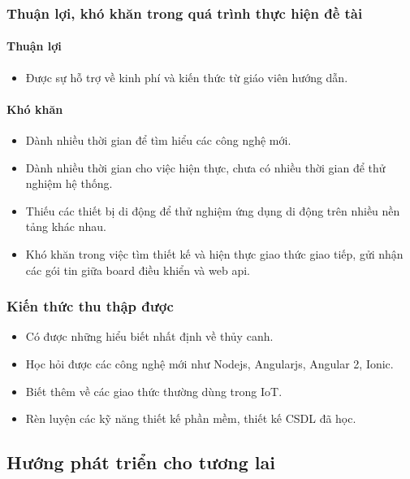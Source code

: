 \documentclass[a4paper,12pt,oneside]{article}
\begin{document}
	\subsubsection{Thuận lợi, khó khăn trong quá trình thực hiện đề tài}	
	\paragraph{Thuận lợi}
		\begin{itemize}
		\item Được sự hỗ trợ về kinh phí và kiến thức từ giáo viên hướng dẫn. 
		\end{itemize}
	\paragraph{Khó khăn}
		\begin{itemize}
		\item Dành nhiều thời gian để tìm hiểu các công nghệ mới. 

		\item Dành nhiều thời gian cho việc hiện thực, chưa có nhiều thời gian để thử nghiệm hệ thống. 

		\item Thiếu các thiết bị di động để thử nghiệm ứng dụng di động trên nhiều nền tảng khác nhau. 

		\item  Khó khăn trong việc tìm thiết kế và hiện thực giao thức giao tiếp, gửi nhận các gói tin giữa board điều khiển và web api. 
		\end{itemize}

\subsubsection{Kiến thức thu thập được}
\begin{itemize}
\item Có được những hiểu biết nhất định về thủy canh. 

\item Học hỏi được các công nghệ mới như Nodejs, Angularjs, Angular 2, Ionic. 

\item Biết thêm về các giao thức thường dùng trong IoT. 

\item Rèn luyện các kỹ năng thiết kế phần mềm, thiết kế CSDL đã học. 
\end{itemize}

	
\subsection{Hướng phát triển cho tương lai}
\end{document}
